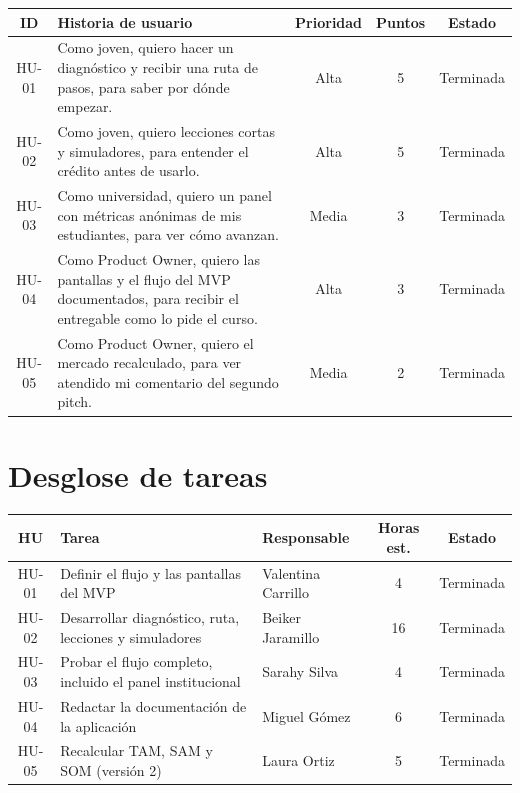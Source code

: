 \documentclass[11pt,a4paper]{article}
\begin{document}
\begin{tabularx}{\textwidth}{c X c c c}
  \toprule
  \textbf{ID} & \textbf{Historia de usuario} & \textbf{Prioridad} & \textbf{Puntos} & \textbf{Estado} \\
  \midrule
  HU-01 & Como joven, quiero hacer un diagnóstico y recibir una ruta de pasos, para saber por dónde empezar. & Alta & 5 & Terminada \\
  HU-02 & Como joven, quiero lecciones cortas y simuladores, para entender el crédito antes de usarlo. & Alta & 5 & Terminada \\
  HU-03 & Como universidad, quiero un panel con métricas anónimas de mis estudiantes, para ver cómo avanzan. & Media & 3 & Terminada \\
  HU-04 & Como Product Owner, quiero las pantallas y el flujo del MVP documentados, para recibir el entregable como lo pide el curso. & Alta & 3 & Terminada \\
  HU-05 & Como Product Owner, quiero el mercado recalculado, para ver atendido mi comentario del segundo pitch. & Media & 2 & Terminada \\
  \bottomrule
\end{tabularx}

\section{Desglose de tareas}

\begin{tabularx}{\textwidth}{c X l c c}
  \toprule
  \textbf{HU} & \textbf{Tarea} & \textbf{Responsable} & \textbf{Horas est.} & \textbf{Estado} \\
  \midrule
  HU-01 & Definir el flujo y las pantallas del MVP & Valentina Carrillo & 4 & Terminada \\
  HU-02 & Desarrollar diagnóstico, ruta, lecciones y simuladores & Beiker Jaramillo & 16 & Terminada \\
  HU-03 & Probar el flujo completo, incluido el panel institucional & Sarahy Silva & 4 & Terminada \\
  HU-04 & Redactar la documentación de la aplicación & Miguel Gómez & 6 & Terminada \\
  HU-05 & Recalcular TAM, SAM y SOM (versión 2) & Laura Ortiz & 5 & Terminada \\
  \bottomrule
\end{tabularx}

\end{document}
